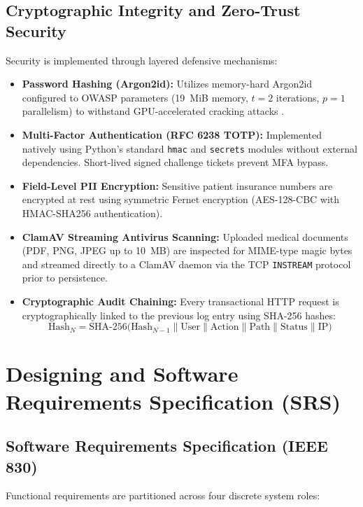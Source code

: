 \documentclass[conference]{IEEEtran}
\begin{document}
\subsection{Cryptographic Integrity and Zero-Trust Security}
Security is implemented through layered defensive mechanisms:
\begin{itemize}
    \item \textbf{Password Hashing (Argon2id):} Utilizes memory-hard Argon2id configured to OWASP parameters (19~MiB memory, $t=2$ iterations, $p=1$ parallelism) to withstand GPU-accelerated cracking attacks \cite{biryukov2016argon2}.
    \item \textbf{Multi-Factor Authentication (RFC 6238 TOTP):} Implemented natively using Python's standard \texttt{hmac} and \texttt{secrets} modules without external dependencies. Short-lived signed challenge tickets prevent MFA bypass.
    \item \textbf{Field-Level PII Encryption:} Sensitive patient insurance numbers are encrypted at rest using symmetric Fernet encryption (AES-128-CBC with HMAC-SHA256 authentication).
    \item \textbf{ClamAV Streaming Antivirus Scanning:} Uploaded medical documents (PDF, PNG, JPEG up to 10~MB) are inspected for MIME-type magic bytes and streamed directly to a ClamAV daemon via the TCP \texttt{INSTREAM} protocol prior to persistence.
    \item \textbf{Cryptographic Audit Chaining:} Every transactional HTTP request is cryptographically linked to the previous log entry using SHA-256 hashes:
    \begin{equation}
    \text{Hash}_N = \text{SHA-256}\Big(\text{Hash}_{N-1} \parallel \text{User} \parallel \text{Action} \parallel \text{Path} \parallel \text{Status} \parallel \text{IP}\Big)
    \end{equation}
\end{itemize}

\section{Designing and Software Requirements Specification (SRS)}
\label{sec:design}

\subsection{Software Requirements Specification (IEEE 830)}
Functional requirements are partitioned across four discrete system roles:
\end{document}
